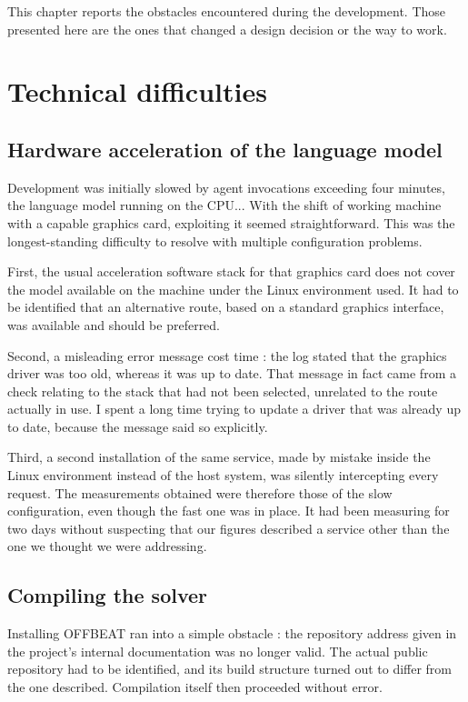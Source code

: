 \documentclass[12pt,a4paper]{report}
\begin{document}
This chapter reports the obstacles encountered during the development. Those presented here are the ones that
changed a design decision or the way to work.

\section{Technical difficulties}

\subsection{Hardware acceleration of the language model}

Development was initially slowed by agent invocations exceeding four minutes,
the language model running on the CPU... With the shift of working machine with a capable
graphics card, exploiting it seemed straightforward. This was the
longest-standing difficulty to resolve with multiple configuration problems.

First, the usual acceleration software stack for that graphics card does
not cover the model available on the machine under the Linux environment used.
It had to be identified that an alternative route, based on a standard graphics
interface, was available and should be preferred.

Second, a misleading error message cost time : the log stated that the graphics
driver was too old, whereas it was up to date. That message in fact came from a
check relating to the stack that had not been selected, unrelated to the route
actually in use. I spent a long time trying to update a driver that was already up to date,
because the message said so explicitly.

Third, a second installation of the same service, made by mistake inside the
Linux environment instead of the host system, was silently intercepting every
request. The measurements obtained were therefore those of the slow
configuration, even though the fast one was in place. It had been measuring for two days without suspecting that our figures
described a service other than the one we thought we were addressing.

\subsection{Compiling the solver}

Installing OFFBEAT ran into a simple obstacle : the repository address given in
the project's internal documentation was no longer valid. The actual public
repository had to be identified, and its build structure turned out to differ
from the one described. Compilation itself then proceeded without error.
\end{document}
